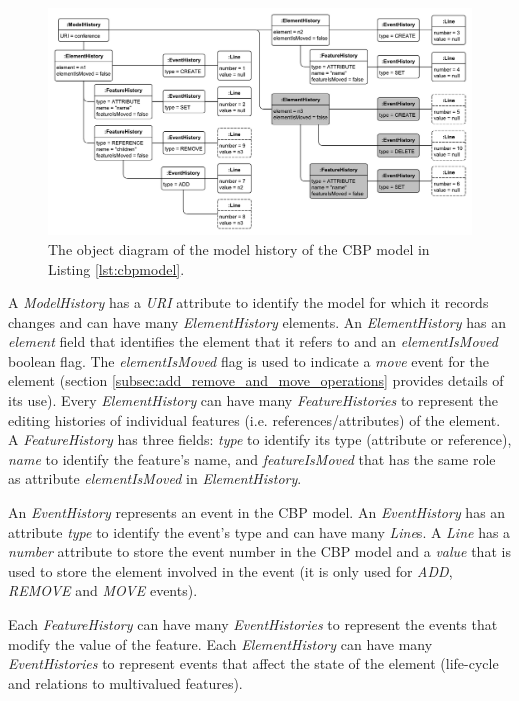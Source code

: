 \documentclass{llncs}
\begin{document}
\begin{figure}[ht]
\centering
\includegraphics[width=\linewidth]{history_structure}
\caption{The object diagram of the model history of the CBP model in Listing \ref{lst:cbpmodel}.}
\label{fig:history_structure}
\end{figure}

A \emph{ModelHistory} has a \emph{URI} attribute to identify the model for which it records changes and can have many \emph{ElementHistory} elements.
An \emph{ElementHistory} has an \emph{element} field that identifies the element that it refers to and an \emph{elementIsMoved} boolean flag. The  \emph{elementIsMoved} flag is used to indicate a \emph{move} event for the element (section \ref{subsec:add_remove_and_move_operations} provides details of its use).
Every \emph{ElementHistory} can have many \emph{FeatureHistories} to represent the editing histories of individual features (i.e. references/attributes) of the element. 
A \emph{FeatureHistory} has three fields: \emph{type} to identify its type (attribute or reference), \emph{name} to identify the feature's name, and \emph{featureIsMoved} that has the same role as attribute \emph{elementIsMoved} in \emph{ElementHistory}.

An \emph{EventHistory} represents an event in the CBP model.
An \emph{EventHistory} has an attribute \emph{type} to identify the event's type and can have many \emph{Line}s.
A \emph{Line} has a \emph{number} attribute to store the event number in the CBP model and a \emph{value} that is used to store the element involved in the event (it is only used for \emph{ADD}, \emph{REMOVE} and \emph{MOVE} events).

Each \emph{FeatureHistory} can have many \emph{EventHistories} to represent the events that modify the value of the feature.
Each \emph{ElementHistory} can have many \emph{EventHistories} to represent events that affect the state of the element (life-cycle and relations to multivalued features).
\end{document}
